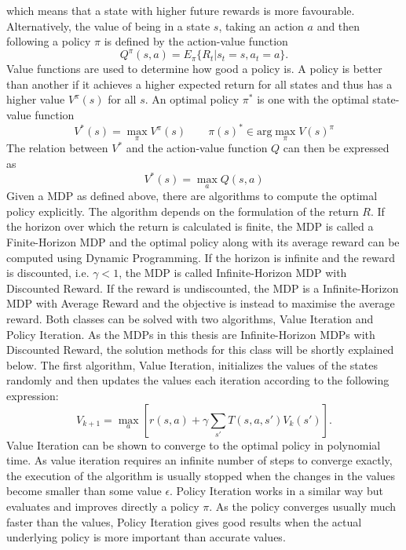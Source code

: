 \documentclass[../main.tex]{subfiles}
\begin{document}
which means that a state with higher future rewards is more favourable. Alternatively, the value of being in a state $s$, taking an action $a$ and then following a policy $\pi$ is defined by the action-value function
\begin{equation}
Q^\pi(s,a) = E_\pi\{R_t|s_t = s, a_t = a\}.
\end{equation}
Value functions are used to determine how good a policy is. A policy is better than another if it achieves a higher expected return for all states and thus has a higher value $V^\pi(s)$ for all $s$. An optimal policy $\pi^*$ is one with the optimal state-value function
\begin{equation}
V^*(s) = \max_\pi V^\pi(s) \qquad \pi(s)^* \in \text{arg}\max_\pi V(s)^\pi 
\end{equation}
The relation between $V^*$ and the action-value function $Q$ can then be expressed as 
\begin{equation}
    V^*(s) = \max_a Q(s,a)
\end{equation}
Given a MDP as defined above, there are algorithms to compute the optimal policy explicitly. The algorithm depends on the formulation of the return $R$. If the horizon over which the return is calculated is finite, the MDP is called a Finite-Horizon MDP and the optimal policy along with its average reward can be computed using Dynamic Programming. If the horizon is infinite and the reward is discounted, i.e. $\gamma<1$, the MDP is called Infinite-Horizon MDP with Discounted Reward. If the reward is undiscounted, the MDP is a Infinite-Horizon MDP with Average Reward and the objective is instead to maximise the average reward. Both classes can be solved with two algorithms, Value Iteration and Policy Iteration. As the MDPs in this thesis are Infinite-Horizon MDPs with Discounted Reward, the solution methods for this class will be shortly explained below.
The first algorithm, Value Iteration, initializes the values of the states randomly and then updates the values each iteration according to the following expression:
\begin{equation}
    V_{k+1} = \max_a \left[ r(s,a) + \gamma  \sum_{s'} T(s,a,s')V_k(s') \right].
\end{equation}
Value Iteration can be shown to converge to the optimal policy in polynomial time. As value iteration requires an infinite number of steps to converge exactly, the execution of the algorithm is usually stopped when the changes in the values become smaller than some value $\epsilon$.
Policy Iteration works in a similar way but evaluates and improves directly a policy $\pi$. As the policy converges usually much faster than the values, Policy Iteration gives good results when the actual underlying policy is more important than accurate values.
\end{document}
